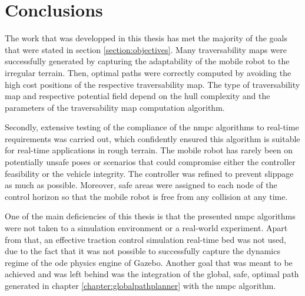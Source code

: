 
\chapter{Conclusions}
\label{chapter:conclusions}

The work that was developped in this thesis has met the majority of the goals that were stated in section \ref{section:objectives}. Many traversability maps were successfully generated by capturing the adaptability of the mobile robot to the irregular terrain. Then, optimal paths were correctly computed by avoiding the high cost positions of the respective traversability map. The type of traversability map and respective potential field depend on the hull complexity and the parameters  of the traversability map computation algorithm.

Secondly, extensive testing of the compliance of the \acrshort{nmpc} algorithms to real-time requirements was carried out, which confidently ensured this algorithm is suitable for real-time applications in rough terrain. The mobile robot has rarely been on potentially unsafe poses or scenarios that could compromise either the controller feasibility or the vehicle integrity. The controller was refined to prevent slippage as much as possible. Moreover, safe areas were assigned to each node of the control horizon  so that the mobile robot is free from any collision at any time.

One of the main deficiencies of this thesis is that the presented \acrshort{nmpc} algorithms were not taken to a simulation environment or a real-world experiment. Apart from that, an effective traction control simulation real-time bed was not used, due to the fact that it was not possible to successfully capture the dynamics regime of the \acrshort{ode} physics engine of Gazebo. Another goal that was meant to be achieved and was left behind was the integration of the global, safe, optimal path generated in chapter \ref{chapter:globalpathplanner} with the \acrshort{nmpc} algorithm. 

